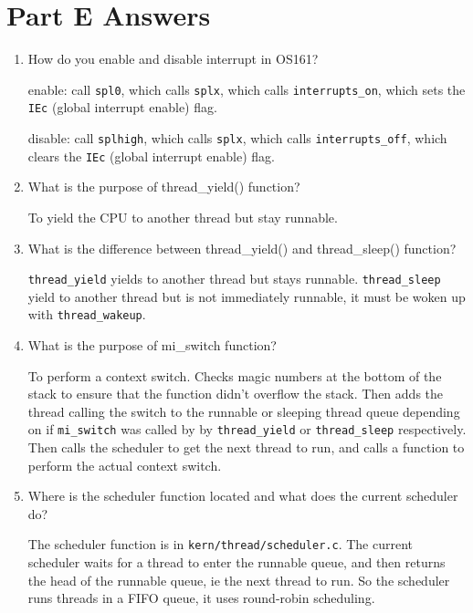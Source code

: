 \documentclass[10pt]{article}
\begin{document}
\section*{Part E Answers}
\begin{enumerate}
    \item How do you enable and disable interrupt in OS161?

        enable: call \verb|spl0|, which calls \verb|splx|, which calls \verb|interrupts_on|,
            which sets the \verb|IEc| (global interrupt enable) flag.

        disable: call \verb|splhigh|, which calls \verb|splx|, which calls \verb|interrupts_off|,
            which clears the \verb|IEc| (global interrupt enable) flag.

    \item What is the purpose of thread\_yield() function?

        To yield the CPU to another thread but stay runnable.

    \item What is the difference between thread\_yield() and thread\_sleep() function?

        \verb|thread_yield| yields to another thread but stays runnable.
        \verb|thread_sleep| yield to another thread but is not immediately runnable,
        it must be woken up with \verb|thread_wakeup|.

    \item What is the purpose of mi\_switch function?

        To perform a context switch. Checks magic numbers at the bottom of the stack to ensure that the
        function didn't overflow the stack. Then adds the thread calling the switch to the runnable or
        sleeping thread queue depending on if \verb|mi_switch| was called by by \verb|thread_yield|
        or \verb|thread_sleep| respectively. Then calls the scheduler to get the next thread to run,
        and calls a function to perform the actual context switch.

    \item Where is the scheduler function located and what does the current scheduler do?

        The scheduler function is in \verb|kern/thread/scheduler.c|. The current scheduler
        waits for a thread to enter the runnable queue, and then returns the head of the runnable queue,
        ie the next thread to run. So the scheduler runs threads in a FIFO queue, it uses
        round-robin scheduling.

\end{enumerate}
\end{document}
